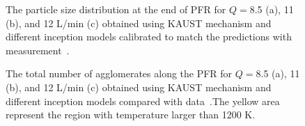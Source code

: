 \begin{figure}[H]
	\centering
	\caption{The particle size distribution at the end of PFR for $Q=$8.5 (a), 11 (b), and 12 L/min (c) obtained using KAUST mechanism and different inception models calibrated to match the predictions with measurement~\citep{mei2019quantitative}.}
	\label{fig:pfr_psd} 
\end{figure}

\begin{figure}[H]
	\centering
	\caption{The total number of agglomerates along the PFR for $Q=$8.5 (a), 11 (b), and 12 L/min (c) obtained using KAUST mechanism and different inception models compared with data~\citep{mei2019quantitative}.The yellow area represent the region with temperature larger than 1200 K.}
	\label{fig:pfr_Nagg} 
\end{figure}


